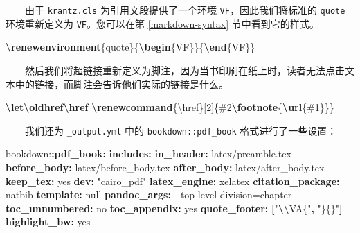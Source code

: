 \documentclass[
  12pt,
]{krantz}
\newenvironment{Shaded}{\begin{snugshade}}{\end{snugshade}}
\newcommand{\AttributeTok}[1]{\textcolor[rgb]{0.13,0.29,0.53}{#1}}
\newcommand{\CharTok}[1]{\textcolor[rgb]{0.31,0.60,0.02}{#1}}
\newcommand{\ExtensionTok}[1]{#1}
\newcommand{\FunctionTok}[1]{\textcolor[rgb]{0.13,0.29,0.53}{\textbf{#1}}}
\newcommand{\KeywordTok}[1]{\textcolor[rgb]{0.13,0.29,0.53}{\textbf{#1}}}
\newcommand{\NormalTok}[1]{#1}
\newcommand{\SpecialCharTok}[1]{\textcolor[rgb]{0.81,0.36,0.00}{\textbf{#1}}}
\newcommand{\StringTok}[1]{\textcolor[rgb]{0.31,0.60,0.02}{#1}}
\theoremstyle{definition}
\theoremstyle{definition}
\theoremstyle{definition}
\theoremstyle{definition}
\theoremstyle{remark}
\begin{document}
  由于 \texttt{krantz.cls} 为引用文段提供了一个环境 \texttt{VF}，因此我们将标准的 \texttt{quote} 环境重新定义为 \texttt{VF}。您可以在第 \ref{markdown-syntax} 节中看到它的样式。

\begin{Shaded}
\begin{Highlighting}[]
\FunctionTok{\textbackslash{}renewenvironment}\NormalTok{\{quote\}\{}\KeywordTok{\textbackslash{}begin}\NormalTok{\{}\ExtensionTok{VF}\NormalTok{\}\}\{}\KeywordTok{\textbackslash{}end}\NormalTok{\{}\ExtensionTok{VF}\NormalTok{\}\}}
\end{Highlighting}
\end{Shaded}

  然后我们将超链接重新定义为脚注，因为当书印刷在纸上时，读者无法点击文本中的链接，而脚注会告诉他们实际的链接是什么。

\begin{Shaded}
\begin{Highlighting}[]
\FunctionTok{\textbackslash{}let\textbackslash{}oldhref\textbackslash{}href}
\FunctionTok{\textbackslash{}renewcommand}\NormalTok{\{}\ExtensionTok{\textbackslash{}href}\NormalTok{\}[2]\{\#2}\FunctionTok{\textbackslash{}footnote}\NormalTok{\{}\FunctionTok{\textbackslash{}url}\NormalTok{\{\#1\}\}\}}
\end{Highlighting}
\end{Shaded}

  我们还为 \texttt{\_output.yml} 中的 \texttt{bookdown::pdf\_book} 格式进行了一些设置：

\begin{Shaded}
\begin{Highlighting}[]
\AttributeTok{bookdown:}\FunctionTok{:pdf\_book}\KeywordTok{:}
\AttributeTok{  }\FunctionTok{includes}\KeywordTok{:}
\AttributeTok{    }\FunctionTok{in\_header}\KeywordTok{:}\AttributeTok{ latex/preamble.tex}
\AttributeTok{    }\FunctionTok{before\_body}\KeywordTok{:}\AttributeTok{ latex/before\_body.tex}
\AttributeTok{    }\FunctionTok{after\_body}\KeywordTok{:}\AttributeTok{ latex/after\_body.tex}
\AttributeTok{  }\FunctionTok{keep\_tex}\KeywordTok{:}\AttributeTok{ }\CharTok{yes}
\AttributeTok{  }\FunctionTok{dev}\KeywordTok{:}\AttributeTok{ }\StringTok{"cairo\_pdf"}
\AttributeTok{  }\FunctionTok{latex\_engine}\KeywordTok{:}\AttributeTok{ xelatex}
\AttributeTok{  }\FunctionTok{citation\_package}\KeywordTok{:}\AttributeTok{ natbib}
\AttributeTok{  }\FunctionTok{template}\KeywordTok{:}\AttributeTok{ }\CharTok{null}
\AttributeTok{  }\FunctionTok{pandoc\_args}\KeywordTok{:}\AttributeTok{ {-}{-}top{-}level{-}division=chapter}
\AttributeTok{  }\FunctionTok{toc\_unnumbered}\KeywordTok{:}\AttributeTok{ }\CharTok{no}
\AttributeTok{  }\FunctionTok{toc\_appendix}\KeywordTok{:}\AttributeTok{ }\CharTok{yes}
\AttributeTok{  }\FunctionTok{quote\_footer}\KeywordTok{:}\AttributeTok{ }\KeywordTok{[}\StringTok{"}\SpecialCharTok{\textbackslash{}\textbackslash{}}\StringTok{VA\{"}\KeywordTok{,}\AttributeTok{ }\StringTok{"\}\{\}"}\KeywordTok{]}
\AttributeTok{  }\FunctionTok{highlight\_bw}\KeywordTok{:}\AttributeTok{ }\CharTok{yes}
\end{Highlighting}
\end{Shaded}
\end{document}
